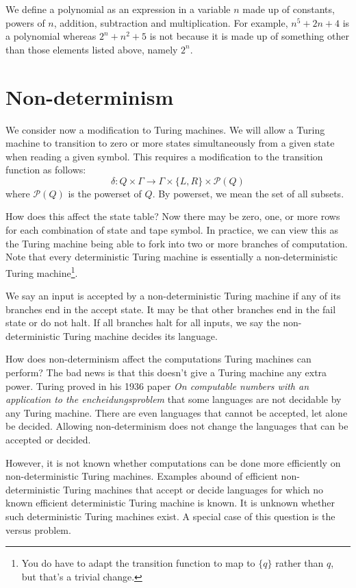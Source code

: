\documentclass{iansnotes}
\begin{document}
  We define a polynomial as an expression in a variable $n$ made up of constants, powers of $n$, addition, subtraction and multiplication.
  For example, $n^5 + 2n + 4$ is a polynomial whereas $2^n + n^2 + 5$ is not because it is made up of something other than those elements listed above, namely $2^n$.


\section{Non-determinism}
  \label{sect:nondet}
  We consider now a modification to Turing machines.
  We will allow a Turing machine to transition to zero or more states simultaneously from a given state when reading a given symbol.
  This requires a modification to the transition function as follows:
   \[ \delta: Q \times \Gamma \rightarrow \Gamma \times \{ L, R \} \times \mathcal{P}(Q) \]
  where $\mathcal{P}(Q)$ is the powerset of $Q$.
  By powerset, we mean the set of all subsets.

  How does this affect the state table?
  Now there may be zero, one, or more rows for each combination of state and tape symbol.
  In practice, we can view this as the Turing machine being able to fork into two or more branches of computation.
  Note that every deterministic Turing machine is essentially a non-deterministic Turing machine\footnote{You do have to adapt the transition function to map to $\{ q \}$ rather than $q$, but that's a trivial change.}.

  We say an input is accepted by a non-deterministic Turing machine if any of its branches end in the accept state.
  It may be that other branches end in the fail state or do not halt.
  If all branches halt for all inputs, we say the non-deterministic Turing machine decides its language.

  How does non-determinism affect the computations Turing machines can perform?
  The bad news is that this doesn't give a Turing machine any extra power.
  Turing proved in his 1936 paper \emph{On computable numbers with an application to the encheidungsproblem} that some languages are not decidable by any Turing machine.
  There are even languages that cannot be accepted, let alone be decided.
  Allowing non-determinism does not change the languages that can be accepted or decided.

  However, it is not known whether computations can be done more efficiently on non-deterministic Turing machines.
  Examples abound of efficient non-deterministic Turing machines that accept or decide languages for which no known efficient deterministic Turing machine is known.
  It is unknown whether such deterministic Turing machines exist.
  A special case of this question is the  versus  problem.
\end{document}
